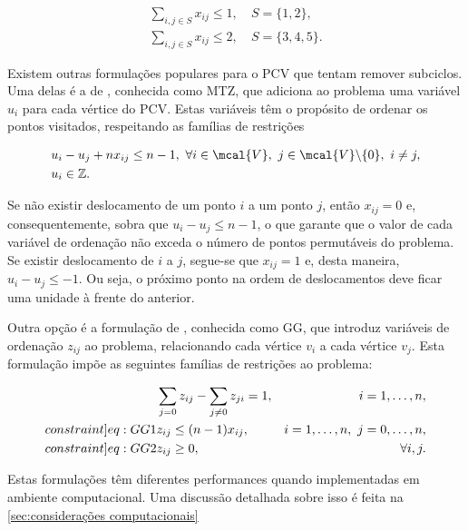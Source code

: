 \begin{align}
\sum_{i,j \in S}x_{ij} \leq 1,\ &S = \{1,2\},\\
\sum_{i,j \in S}x_{ij} \leq 2,\ &S = \{3,4,5\}.
\end{align}

Existem outras formulações populares para o PCV que tentam remover subciclos. Uma delas é a de \textcite{MILLER:60}, conhecida como MTZ, que adiciona ao problema uma variável $u_i$ para cada vértice do PCV. Estas variáveis têm o propósito de ordenar os pontos visitados, respeitando as famílias de restrições

\begin{align}
    &u_i - u_j + nx_{ij} \leq n - 1,\ \forall i \in \mcal{V},\ j \in \mcal{V}\backslash\{0\},\ i \neq j,\\
    &u_i \in \mathbb{Z}.
\end{align}

Se não existir deslocamento de um ponto $i$ a um ponto $j$, então $x_{ij} = 0$ e, consequentemente, sobra que $u_i - u_j \leq n - 1$, o que garante que o valor de cada variável de ordenação não exceda o número de pontos permutáveis do problema. Se existir deslocamento de $i$ a $j$, segue-se que $x_{ij} = 1$ e, desta maneira, $u_i - u_j \leq -1$. Ou seja, o próximo ponto na ordem de deslocamentos deve ficar uma unidade à frente do anterior.

Outra opção é a formulação de \textcite{GAVISH:78}, conhecida como GG, que introduz variáveis de ordenação $z_{ij}$ ao problema, relacionando cada vértice $v_i$ a cada vértice $v_j$. Esta formulação impõe as seguintes famílias de restrições ao problema:

\begin{align}
    &\sum_{j=0}z_{ij} - \sum_{j\neq0}z_{ji} = 1,&i = 1,\ldots,n,\\\label[constraint]{eq:GG1}
    &z_{ij} \leq (n - 1)x_{ij},&i = 1,\ldots,n,\ j = 0,\ldots,n,\\\label[constraint]{eq:GG2}
    &z_{ij} \geq 0,&\forall i, j.
\end{align}

Estas formulações têm diferentes performances quando implementadas em ambiente computacional. Uma discussão detalhada sobre isso é feita na \cref{sec:considerações computacionais}

